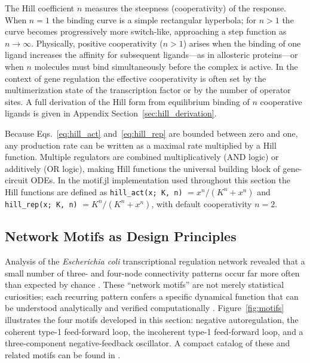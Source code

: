 The Hill coefficient $n$ measures the steepness (cooperativity) of the
response.  When $n = 1$ the binding curve is a simple rectangular hyperbola;
for $n > 1$ the curve becomes progressively more switch-like, approaching a
step function as $n \to \infty$.  Physically, positive cooperativity ($n > 1$)
arises when the binding of one ligand increases the affinity for subsequent
ligands---as in allosteric proteins---or when $n$ molecules must bind
simultaneously before the complex is active.  In the context of gene regulation
the effective cooperativity is often set by the multimerization state of the
transcription factor or by the number of operator sites.  A full derivation of
the Hill form from equilibrium binding of $n$ cooperative ligands is given in
Appendix Section~\ref{sec:hill_derivation}.

Because Eqs.~\eqref{eq:hill_act} and~\eqref{eq:hill_rep} are bounded between
zero and one, any production rate can be written as a maximal rate multiplied
by a Hill function.  Multiple regulators are combined multiplicatively (AND
logic) or additively (OR logic), making Hill functions the universal building
block of gene-circuit ODEs.  In the motif.jl implementation used throughout
this section the Hill functions are defined as
\texttt{hill\_act(x; K, n)} $= x^n/(K^n + x^n)$ and
\texttt{hill\_rep(x; K, n)} $= K^n/(K^n + x^n)$,
with default cooperativity $n = 2$.

\subsection{Network Motifs as Design Principles}
\label{sec:motifs}

Analysis of the \textit{Escherichia coli} transcriptional regulation network
revealed that a small number of three- and four-node connectivity patterns
occur far more often than expected by chance \cite{ShenOrr2002}.  These
``network motifs'' are not merely statistical curiosities; each recurring
pattern confers a specific dynamical function that can be understood
analytically and verified computationally \cite{Alon2006,Alon2007}.
Figure~\ref{fig:motifs} illustrates the four motifs developed in this section:
negative autoregulation, the coherent type-1 feed-forward loop, the incoherent
type-1 feed-forward loop, and a three-component negative-feedback oscillator.
A compact catalog of these and related motifs can be found in
\citet{ShovalAlon2010}.

